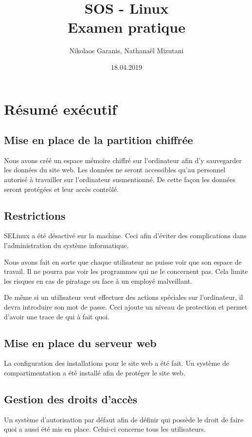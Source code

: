 \documentclass{extarticle} %
\title{SOS - Linux\\Examen pratique}
\author{Nikolaos Garanis, Nathanaël Mizutani}
\date{18.04.2019}
\begin{document}
    \maketitle

    \bigbreak

    \tableofcontents

    \pagebreak

    \section{Résumé exécutif}
    \subsection{Mise en place de la partition chiffrée}
    Nous avons créé un espace mémoire chiffré sur l'ordinateur afin d'y sauvegarder les données du site web.
    Les données ne seront accessibles qu'au personnel autorisé à travailler sur l'ordinateur susmentionné.
    De cette façon les données seront protégées et leur accès contrôlé.

    \subsection{Restrictions}
    SELinux a été désactivé sur la machine. Ceci afin d'éviter des complications dans l'administration du système
    informatique.

    Nous avons fait en sorte que chaque utilisateur ne puisse voir que son espace de travail.
    Il ne pourra pas voir les programmes qui ne le concernent pas. Cela limite les risques en cas 
    de piratage ou face à un employé malveillant.

    De même si un utilisateur veut effectuer des actions spéciales sur l'ordinateur, il devra
    introduire son mot de passe. Ceci ajoute un niveau de protection et permet d'avoir une trace
    de qui à fait quoi.

    \subsection{Mise en place du serveur web}
    La configuration des installations pour le site web a été fait. Un système de compartimentation a été installé afin de protéger le site web.

    \subsection{Gestion des droits d'accès}
    Un système d'autorisation par défaut afin de définir qui possède le droit de faire quoi a aussi été mis en place.
    Celui-ci concerne tous les utilisateurs.
\end{document}

